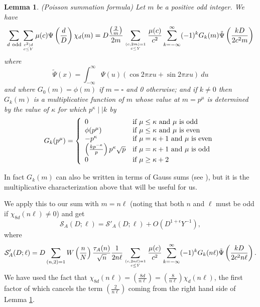 \documentclass[12pt]{amsart}
\newtheorem{lemma}{Lemma}
\begin{document}
	\begin{lemma}  \label{lemma:poisson} (Poisson summation formula)
		Let $m$ be a positive odd integer. We have 
		\begin{eqnarray*}
			\sum_{d ~ \textrm{odd} } \sum_{c^2\mid d\atop c\le Y} \mu(c)
			\Psi\left(\frac d D\right )\chi_d(m)
			=D\frac{\left(\frac 2 m \right)}{2m}\sum_{(c,2m)=1\atop c\le Y} \frac{\mu(c)}{c^2} \sum_{k = -\infty}^\infty (-1)^k   G_k(m) \tilde{\Psi}\left(\frac{kD}{2c^2m}\right)
		\end{eqnarray*} 
		where
		$$\tilde {\Psi}(x)=\int_{-\infty}^\infty \Psi(u)(\cos 2\pi xu+\sin 2\pi xu)~du$$
		and where $G_0(m)=\phi(m) $ if $m=\square$ and 0 otherwise; and  if $k\ne 0$ then  $G_k(m)$  is a multiplicative function of $m$ whose value at 
		$m=p^\mu$ is determined by the value of $\kappa$ for which
		$p^\kappa\mid\mid k$ by 
		\begin{eqnarray*}
			G_k(p^\mu)=\left\{
			\begin{array}{ll}
				0 & \mbox{if $ \mu \le \kappa$ and $\mu$ is odd} \\
				\phi(p^\mu) & \mbox{if $ \mu \le \kappa$ and $\mu$ is even} \\
				-p^\kappa & \mbox{if $ \mu = \kappa+1 $ and $\mu$ is even} \\
				\left(\frac{kp^{-\kappa}}{p}\right)p^\kappa\sqrt{p} & \mbox{if $ \mu = \kappa+1 $ and $\mu$ is odd} \\
				0 & \mbox{if $\mu\ge \kappa+2$}
			\end{array}
			\right.
		\end{eqnarray*}
	\end{lemma}
	
	In fact $G_k(m)$ can also be written in terms of Gauss sums (see \cite[Sec. 2.2]{Sou}), but it is the multiplicative characterization above that will be useful for us.
	
	We apply this to our sum with $m=n\ell$ (noting that both $n$ and $\ell$ must be odd if $\chi_{8d}(n\ell) \neq 0$) and get
	$$
	\mathcal S_A(D;\ell) = \mathcal S'_A(D;\ell) + O(D^{1+\epsilon}Y^{-1}),
	$$
	where
	\begin{equation}
		\label{eq:SA after poisson}
		\mathcal S'_A(D;\ell)=D \sum_{(n,2)=1} W\left(\frac n N\right) \frac{\tau_A(n)}{\sqrt{n}}\frac{1}{2n\ell}
		\sum_{(c,2n\ell)=1\atop c\le Y}\frac{\mu(c)}{c^2}\sum_{k = -\infty}^\infty (-1)^k G_k(n\ell) \tilde \Psi\left(\frac {kD}{2c^2n\ell}\right).
	\end{equation}
	We have used the fact that $\chi_{8d}(n\ell) = \left( \frac{8d}{n\ell}\right) = \left( \frac 8 {n\ell}\right) \chi_d(n\ell)$, the first factor of which cancels the term $\left( \frac 2 {n\ell} \right)$ coming from the right hand side of Lemma \ref{lemma:poisson}.
	
\end{document}
